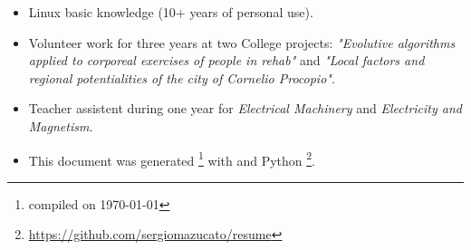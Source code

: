 \documentclass[]{friggeri-cv}
\begin{document}
\begin{itemize}
	\item Linux basic knowledge (10+ years of personal use).
	\item Volunteer work for three years at two College projects: \textit{"Evolutive algorithms applied to corporeal exercises of people in rehab"} and \textit{"Local factors and regional potentialities of the city of Cornelio Procopio"}.
	\item Teacher assistent during one year for \textit{Electrical Machinery} and \textit{Electricity and Magnetism}.
	\item This document was generated \footnote{compiled on \today} with \myfont{\LaTeX} and Python \footnote{\url{https://github.com/sergiomazucato/resume}}.\\
\end{itemize}

\end{document}
